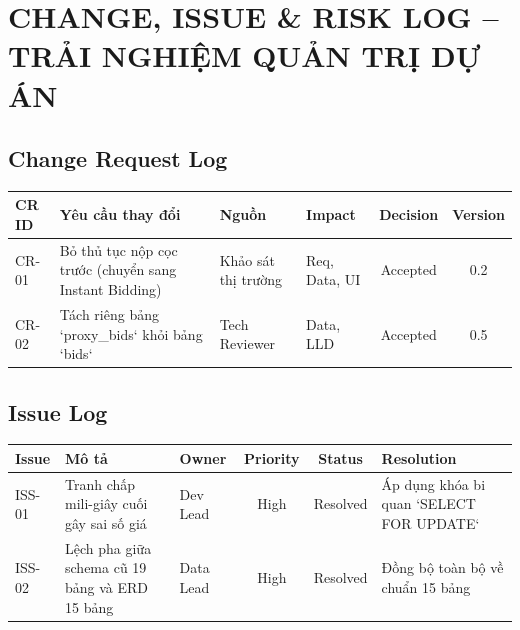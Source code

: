 \documentclass[11pt,a4paper]{article}
\begin{document}
\section{CHANGE, ISSUE \& RISK LOG -- TRẢI NGHIỆM QUẢN TRỊ DỰ ÁN}

\subsection{Change Request Log}
\begin{table}[H]
    \centering
    \small
    \begin{tabularx}{\textwidth}{|l|X|l|l|c|c|}
        \hline
        \textbf{CR ID} & \textbf{Yêu cầu thay đổi} & \textbf{Nguồn} & \textbf{Impact} & \textbf{Decision} & \textbf{Version} \\ \hline
        CR-01 & Bỏ thủ tục nộp cọc trước (chuyển sang Instant Bidding) & Khảo sát thị trường & Req, Data, UI & Accepted & 0.2 \\ \hline
        CR-02 & Tách riêng bảng `proxy_bids` khỏi bảng `bids` & Tech Reviewer & Data, LLD & Accepted & 0.5 \\ \hline
    \end{tabularx}
\end{table}

\subsection{Issue Log}
\begin{table}[H]
    \centering
    \small
    \begin{tabularx}{\textwidth}{|l|X|l|c|c|X|}
        \hline
        \textbf{Issue} & \textbf{Mô tả} & \textbf{Owner} & \textbf{Priority} & \textbf{Status} & \textbf{Resolution} \\ \hline
        ISS-01 & Tranh chấp mili-giây cuối gây sai số giá & Dev Lead & High & Resolved & Áp dụng khóa bi quan `SELECT FOR UPDATE` \\ \hline
        ISS-02 & Lệch pha giữa schema cũ 19 bảng và ERD 15 bảng & Data Lead & High & Resolved & Đồng bộ toàn bộ về chuẩn 15 bảng \\ \hline
    \end{tabularx}
\end{table}
\end{document}
